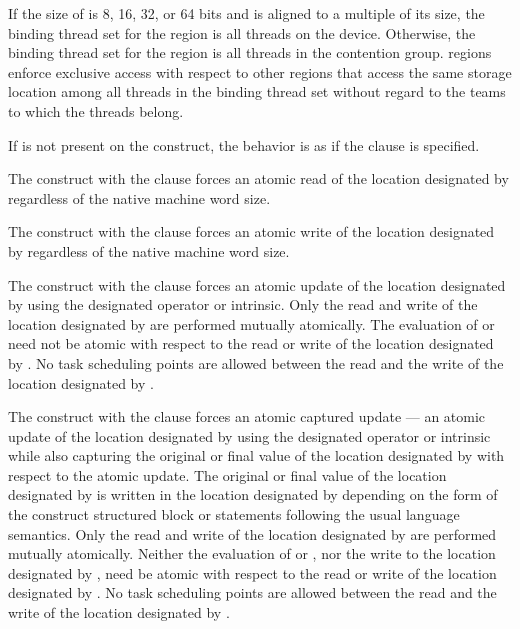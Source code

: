 \begin{samepage}

\binding
If the size of  is 8, 16, 32, or 64 bits and  is aligned to a
multiple of its size, the binding thread set for the  region is
all threads on the device. Otherwise, the binding thread set for the
 region is all threads in the contention group.  
regions enforce exclusive access with respect to other  regions
that access the same storage location  among all threads in the
binding thread set without regard to the teams to which the threads belong.

\descr

If  is not present on the construct, the behavior is as if
the  clause is specified.

The  construct with the  clause forces an
atomic read of the location 
designated by  regardless of the native machine word size.
\end{samepage}

The  construct with the  clause forces an
atomic write of the location 
designated by  regardless of the native machine word size.

The  construct with the  clause forces an
atomic update of the location designated by  using the
designated operator or intrinsic.  Only the read and write of the
location designated by  are performed mutually atomically. The
evaluation of  or  need not be atomic with respect to
the read or write of the location designated by . No task scheduling
points are allowed between the read and the write of the location designated
by . 

The  construct with the  clause forces an
atomic captured update --- an atomic update of the
location designated by  using the designated operator or intrinsic
while also capturing the original or final value of the location designated by
 with respect to the atomic update. The original or final value of the
location designated by  is written in the location designated by
 depending on the form of the  construct structured block
or statements following the usual language semantics. Only the read and write
of the location designated by  are performed mutually atomically.
Neither the evaluation of  or , nor the write to the
location designated by , need be atomic with respect to the read or
write of the location designated by . No task scheduling points are
allowed between the read and the write of the location designated by .

